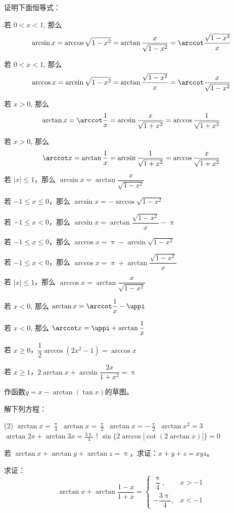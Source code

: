 \begin{Exercise}
\begin{question}
\begin{tasks}
  \end{tasks}   
  \item 证明下面恒等式：
  \begin{question}[label=\alph*),listparindent=0pt]
    \item 若 $0<x<1$, 那么
    \[\arcsin x=\arccos\sqrt{1-x^2}=\arctan\frac{x}{\sqrt{1-x^2}}=\arccot\frac{\sqrt{1-x^2}}{x}\]
    \item 若 $0<x<1$, 那么
    \[\arccos x=\arcsin\sqrt{1-x^2}=\arctan\frac{\sqrt{1-x^2}}{x}=\arccot\frac{x}{\sqrt{1-x^2}}\]
    \item 若 $x>0$, 那么
    \[\arctan x=\arccot \frac{1}{x}=\arcsin\frac{x}{\sqrt{1+x^2}}=\arccos\frac{1}{\sqrt{1+x^2}}\]
    \item 若 $x>0$, 那么
    \[\arccot x=\arctan \frac{1}{x}=\arcsin\frac{1}{\sqrt{1+x^2}}=\arccos\frac{x}{\sqrt{1+x^2}}\]
    \item 若 $|x|\leqslant 1$，那么 $\arcsin x=\arctan\dfrac{x}{\sqrt{1-x^2}}$

    若 $-1\leqslant x\leqslant 0$，那么 $\arcsin x=-\arccos{\sqrt{1-x^2}}$

    若 $-1\leqslant x< 0$，那么 $\arcsin x=\arctan\dfrac{\sqrt{1-x^2}}{x}-\uppi$

    \item 若 $-1\leqslant x\leqslant 0$，那么 $\arccos x=\uppi-\arcsin{\sqrt{1-x^2}}$

    若 $-1\leqslant x< 0$，那么 $\arccos x=\uppi+\arctan\dfrac{\sqrt{1-x^2}}{x}$

    若 $|x|\leqslant 1$，那么 $\arccos x=\arctan\dfrac{x}{\sqrt{1-x^2}}$

    \item 若 $x<0$, 那么 $\arctan x=\arccot \dfrac{1}{x}-\uppi$

    若 $x<0$, 那么 $\arccot x=\uppi+\arctan\dfrac{1}{x}$

    \item 若 $x\geqslant 0$，$\dfrac{1}{2}\arccos(2x^2-1)=\arccos x$
    \item 若 $x\geqslant 1$，$2\arctan x+\arcsin\dfrac{2x}{1+x^2}=\uppi$
  \end{question}
  \item 作函数$y=x-\arctan(\tan x)$的草图。
  \item 解下列方程：
  \begin{tasks}(2)
    \task $\displaystyle \arctan x=\frac{\uppi}{4}$
    \task $\displaystyle \arctan x=\frac{\uppi}{2}$
    \task $\displaystyle \arctan x=-\frac{\uppi}{2}$
    \task $\displaystyle \arctan x^2=3$
    \task $\displaystyle \arctan 2x+\arctan 3x=\frac{3\uppi}{4}$
    \task! $\sin\Big\{2\arccos\big[\cot(2\arctan x)\big]\Big\}=0$
  \end{tasks}
  \item 若 $\arctan x+\arctan y+ \arctan z=\uppi$，求证：$x+y+z=xyz$。
  \item 求证：
  \[\arctan x+\arctan\frac{1-x}{1+x}=\begin{cases}
    \dfrac{\uppi}{4},& x>-1\\
    -\dfrac{3\uppi}{4},& x<-1
  \end{cases}\]
\end{question}
\end{Exercise}

